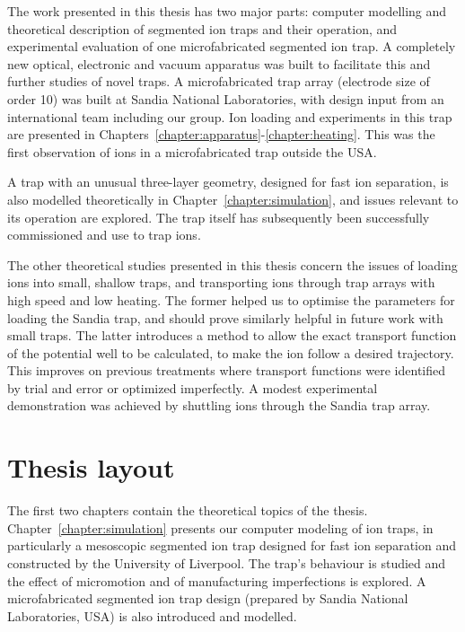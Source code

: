 The work presented in this thesis has two major parts: computer modelling and theoretical description of segmented ion traps and their operation, and experimental evaluation of one microfabricated segmented ion trap. A completely new optical, electronic and vacuum apparatus was built to facilitate this and further studies of novel traps. A microfabricated trap array (electrode size of order 10\um) was built at Sandia National Laboratories, with design input from an international team including our group. Ion loading and experiments in this trap
are presented in Chapters~\ref{chapter:apparatus}-\ref{chapter:heating}. This was the first observation of ions in a microfabricated trap outside the USA.
 
A trap with an unusual three-layer geometry, designed for fast ion separation, is also modelled theoretically in Chapter~\ref{chapter:simulation}, and issues relevant to its operation are explored. The trap itself has subsequently  been successfully commissioned and use to trap ions.
 
The other theoretical studies presented in this thesis concern the issues of loading ions into small, shallow traps, and transporting ions through trap arrays with high speed and low heating. The former helped us to optimise the parameters for loading the Sandia trap, and should prove similarly helpful in future work with small traps. The latter introduces a method to allow the exact transport function of the potential well to be calculated, to make the ion follow a desired trajectory. This improves on previous treatments where transport functions were identified by trial and error or optimized imperfectly. A modest experimental demonstration was achieved by shuttling ions through the Sandia trap array.


\section{Thesis layout}
\label{sec:layout}

The first two chapters contain the theoretical topics of the thesis. Chapter~\ref{chapter:simulation} presents our computer modeling of ion traps, in particularly a mesoscopic segmented ion trap designed for fast ion separation and constructed by the University of Liverpool. The trap's behaviour is studied and the effect of micromotion and of manufacturing imperfections is explored. A microfabricated segmented ion trap design (prepared by Sandia National Laboratories, USA) is also introduced and modelled. 

